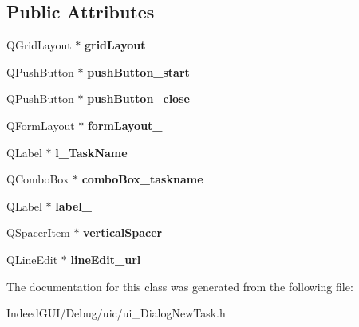 \subsection*{Public Attributes}
\begin{DoxyCompactItemize}
\item 
\hypertarget{class_ui___dialog_new_task_a0da8ff302b18ae7714612355fddcb6b3}{}Q\+Grid\+Layout $\ast$ {\bfseries grid\+Layout}\label{class_ui___dialog_new_task_a0da8ff302b18ae7714612355fddcb6b3}

\item 
\hypertarget{class_ui___dialog_new_task_a9be6d1f4132d92ae69303837af1ca606}{}Q\+Push\+Button $\ast$ {\bfseries push\+Button\+\_\+start}\label{class_ui___dialog_new_task_a9be6d1f4132d92ae69303837af1ca606}

\item 
\hypertarget{class_ui___dialog_new_task_a050ccf2ac00a99c302d85d4a3e3a9542}{}Q\+Push\+Button $\ast$ {\bfseries push\+Button\+\_\+close}\label{class_ui___dialog_new_task_a050ccf2ac00a99c302d85d4a3e3a9542}

\item 
\hypertarget{class_ui___dialog_new_task_ab93c6578c404ce9368cc0f9690c94996}{}Q\+Form\+Layout $\ast$ {\bfseries form\+Layout\+\_}\label{class_ui___dialog_new_task_ab93c6578c404ce9368cc0f9690c94996}

\item 
\hypertarget{class_ui___dialog_new_task_a55851b7c4f703f823fd0aaef8b1f5794}{}Q\+Label $\ast$ {\bfseries l\+\_\+\+Task\+Name}\label{class_ui___dialog_new_task_a55851b7c4f703f823fd0aaef8b1f5794}

\item 
\hypertarget{class_ui___dialog_new_task_a791148c00f22b8d9d4d2a670a8b3ad28}{}Q\+Combo\+Box $\ast$ {\bfseries combo\+Box\+\_\+taskname}\label{class_ui___dialog_new_task_a791148c00f22b8d9d4d2a670a8b3ad28}

\item 
\hypertarget{class_ui___dialog_new_task_acc580fae1deda56318a733926a904371}{}Q\+Label $\ast$ {\bfseries label\+\_}\label{class_ui___dialog_new_task_acc580fae1deda56318a733926a904371}

\item 
\hypertarget{class_ui___dialog_new_task_a9ec6d6cddfacb906265bd551937914e0}{}Q\+Spacer\+Item $\ast$ {\bfseries vertical\+Spacer}\label{class_ui___dialog_new_task_a9ec6d6cddfacb906265bd551937914e0}

\item 
\hypertarget{class_ui___dialog_new_task_a4661f2df91f46bc1b60200e695ed2b56}{}Q\+Line\+Edit $\ast$ {\bfseries line\+Edit\+\_\+url}\label{class_ui___dialog_new_task_a4661f2df91f46bc1b60200e695ed2b56}

\end{DoxyCompactItemize}


The documentation for this class was generated from the following file\+:\begin{DoxyCompactItemize}
\item 
Indeed\+G\+U\+I/\+Debug/uic/ui\+\_\+\+Dialog\+New\+Task.\+h\end{DoxyCompactItemize}
